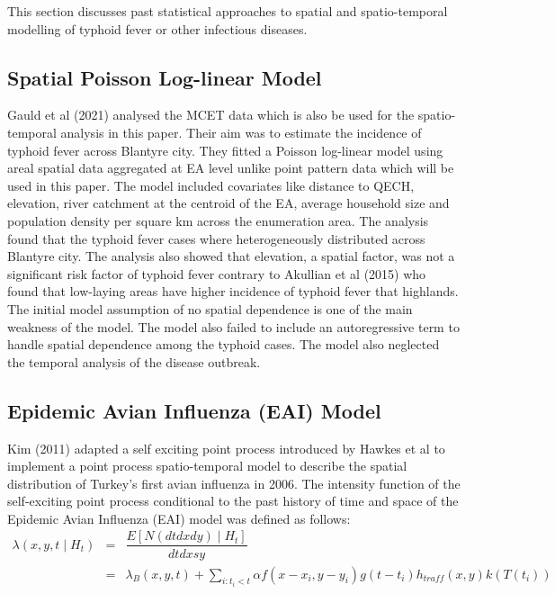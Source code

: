 \documentclass[12pt,a4paper]{report}
\begin{document}
This section discusses past statistical approaches to spatial and spatio-temporal modelling of typhoid fever or other infectious diseases.

\subsection{Spatial Poisson Log-linear Model}

Gauld et al (2021) analysed the MCET data which is also be used for the spatio-temporal analysis in this paper. Their aim was to estimate the incidence of typhoid fever across Blantyre city. They fitted a Poisson log-linear model using areal spatial data aggregated at EA level unlike point pattern data which will be used in this paper. The model included covariates like distance to QECH, elevation, river catchment at the centroid of the EA, average household size and population density per square km across the enumeration area. The analysis found that the typhoid fever cases where heterogeneously distributed across Blantyre city. The analysis also showed that elevation, a spatial factor, was not a significant risk factor of typhoid fever contrary to Akullian et al (2015) who found that low-laying areas have higher incidence of typhoid fever that highlands.\cite{Gauld2021} \cite{Akullian} The initial model assumption of no spatial dependence is one of the main weakness of the model. The model also failed to include an autoregressive term to handle spatial dependence among the typhoid cases. The model also neglected the temporal analysis of the disease outbreak.

\subsection{Epidemic Avian Influenza (EAI) Model}

Kim (2011) adapted a self exciting point process introduced by Hawkes et al\cite{Hawkes&Oakes1974} to implement a point process spatio-temporal model to describe the spatial distribution of Turkey's first avian influenza in 2006.\cite{Kim} The intensity function of the self-exciting point process conditional to the past history of time and space of the Epidemic Avian Influenza (EAI) model was defined as follows:
\begin{eqnarray*}
\lambda(x,y,t \mid H_t) &=& \dfrac{E\left[ N(dt dx dy) \mid H_t\right]}{dt dx sy}\\
&=& \lambda_B(x,y,t) + \sum_{i:t_i<t}\alpha f(x - x_i, y-y_i) g(t - t_i) h_{traff}(x,y)k(T(t_i))
\end{eqnarray*}
\end{document}
